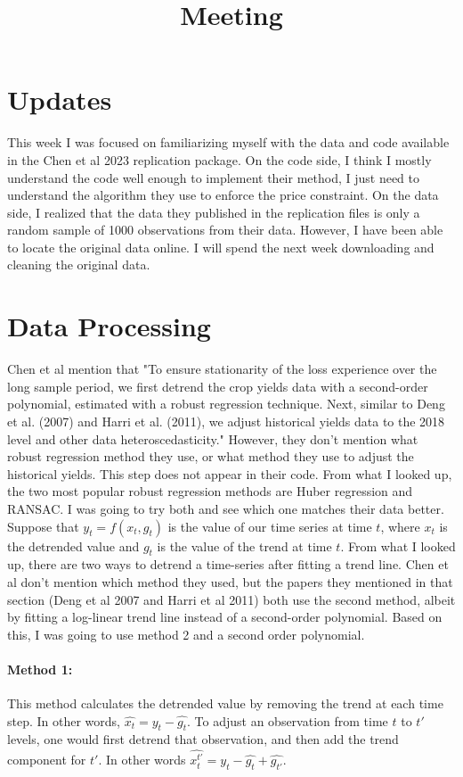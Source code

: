 \documentclass[11pt]{article}
\title{Meeting}
\begin{document}
\maketitle

\section{Updates}
This week I was focused on familiarizing myself with the data and code available in the Chen et al 2023 replication package. On the code side, I think I mostly understand the code well enough to implement their method, I just need to understand the algorithm they use to enforce the price constraint. On the data side, I realized that the data they published in the replication files is only a random sample of 1000 observations from their data. However, I have been able to locate the original data online. I will spend the next week downloading and cleaning the original data. 

\section{Data Processing}
Chen et al mention that "To ensure stationarity of the loss experience over the long sample period, we first detrend the crop yields data with a second-order polynomial, estimated with a robust regression technique. Next, similar to Deng et al. (2007) and Harri et al. (2011), we adjust historical yields data to the 2018 level and other data heteroscedasticity." However, they don't mention what robust regression method they use, or what method they use to adjust the historical yields. This step does not appear in their code. From what I looked up, the two most popular robust regression methods are Huber regression and RANSAC. I was going to try both and see which one matches their data better.  \\

Suppose that $y_t = f(x_t,g_t)$ is the value of our time series at time $t$, where $x_t$ is the detrended value and $g_t$ is the value of the trend at time $t$. From what I looked up, there are two ways to detrend a time-series after fitting a trend line. Chen et al don't mention which method they used, but the papers they mentioned in that section (Deng et al 2007 and Harri et al 2011) both use the second method, albeit by fitting a log-linear trend line instead of a second-order polynomial. Based on this, I was going to use method 2 and a second order polynomial. 

\paragraph{Method 1:} This method calculates the detrended value by removing the trend at each time step. In other words, $\hat{x_t} = y_t-\hat{g_t}$. To adjust an observation from time $t$ to $t'$ levels, one would first detrend that observation, and then add the trend component for $t'$. In other words $\hat{x^{t'}_t} = y_t - \hat{g_t} + \hat{g_{t'}}$. 
\end{document}
